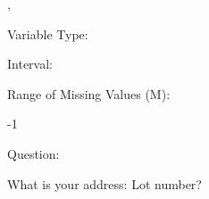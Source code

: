 \documentclass[
]{article}
\begin{document}
,

\begin{minipage}[t]{0.3\linewidth}

\colorbox{mypink1}{}

\end{minipage}%
\begin{minipage}[t]{0.7\linewidth}

\colorbox{mypink1}{\makebox[\textwidth]{\strut\bfseries\color{black}  
 }}

\end{minipage}

\begin{minipage}[t]{0.3\linewidth}

Variable Type:

\end{minipage}%
\begin{minipage}[t]{0.7\linewidth}

\end{minipage}

\begin{minipage}[t]{0.3\linewidth}

Interval:

\end{minipage}%
\begin{minipage}[t]{0.7\linewidth}

\end{minipage}

\begin{minipage}[t]{0.3\linewidth}

Range of Missing Values (M):

\end{minipage}%
\begin{minipage}[t]{0.7\linewidth}

-1

\end{minipage}

\begin{minipage}[t]{0.3\linewidth}

Question:

\end{minipage}%
\begin{minipage}[t]{0.7\linewidth}

What is your address: Lot number?

\end{minipage}
\end{document}
